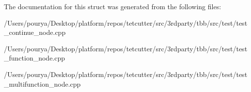 The documentation for this struct was generated from the following files\+:\begin{DoxyCompactItemize}
\item 
/\+Users/pourya/\+Desktop/platform/repos/tetcutter/src/3rdparty/tbb/src/test/test\+\_\+continue\+\_\+node.\+cpp\item 
/\+Users/pourya/\+Desktop/platform/repos/tetcutter/src/3rdparty/tbb/src/test/test\+\_\+function\+\_\+node.\+cpp\item 
/\+Users/pourya/\+Desktop/platform/repos/tetcutter/src/3rdparty/tbb/src/test/test\+\_\+multifunction\+\_\+node.\+cpp\end{DoxyCompactItemize}
